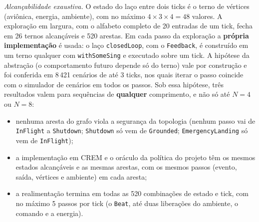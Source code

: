 \documentclass[12pt,a4paper]{article}
\begin{document}
\textit{Alcançabilidade exaustiva.} O estado do laço entre dois ticks é o terno de vértices (aviônica, energia, ambiente), com no máximo $4 \times 3 \times 4 = 48$ valores. A exploração em largura, com o alfabeto completo de 20 entradas de um tick, fecha em 26 ternos alcançáveis e 520 arestas. Em cada passo da exploração a \textbf{própria implementação} é usada: o laço \texttt{closedLoop}, com o \texttt{Feedback}, é construído em um terno qualquer com \texttt{withSomeSing} e executado sobre um tick. A hipótese da abstração (o comportamento futuro depende só do terno) vale por construção e foi conferida em 8\,421 cenários de até 3 ticks, nos quais iterar o passo coincide com o simulador de cenários em todos os passos. Sob essa hipótese, três resultados valem para sequências de \textbf{qualquer} comprimento, e não só até $N = 4$ ou $N = 8$:

\begin{itemize}
\item nenhuma aresta do grafo viola a segurança da topologia (nenhum passo vai de \texttt{InFlight} a \texttt{Shutdown}; \texttt{Shutdown} só vem de \texttt{Grounded}; \texttt{EmergencyLanding} só vem de \texttt{InFlight});
\item a implementação em CREM e o oráculo da política do projeto têm os mesmos estados alcançáveis e as mesmas arestas, com os mesmos passos (evento, saída, vértices e ambiente) em cada aresta;
\item a realimentação termina em todas as 520 combinações de estado e tick, com no máximo 5 passos por tick (o \texttt{Beat}, até duas liberações do ambiente, o comando e a energia).
\end{itemize}
\end{document}
